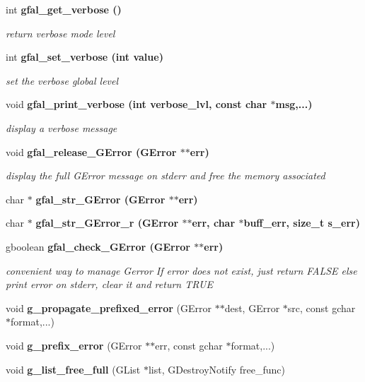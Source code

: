 \begin{CompactItemize}
\item 
int \bf{gfal\_\-get\_\-verbose} ()\label{gfal__common__errverbose_8c_135b3fdd775aa7215e2ab4de1eea495f}

\begin{CompactList}\small\item\em return verbose mode level \item\end{CompactList}\item 
int \bf{gfal\_\-set\_\-verbose} (int value)
\begin{CompactList}\small\item\em set the verbose global level \item\end{CompactList}\item 
void \bf{gfal\_\-print\_\-verbose} (int verbose\_\-lvl, const char $\ast$msg,...)
\begin{CompactList}\small\item\em display a verbose message \item\end{CompactList}\item 
void \bf{gfal\_\-release\_\-GError} (GError $\ast$$\ast$err)\label{gfal__common__errverbose_8c_1441ea4b8176eb0cf3099009b950a3e9}

\begin{CompactList}\small\item\em display the full GError message on stderr and free the memory associated \item\end{CompactList}\item 
char $\ast$ \bf{gfal\_\-str\_\-GError} (GError $\ast$$\ast$err)
\item 
char $\ast$ \bf{gfal\_\-str\_\-GError\_\-r} (GError $\ast$$\ast$err, char $\ast$buff\_\-err, size\_\-t s\_\-err)
\item 
gboolean \bf{gfal\_\-check\_\-GError} (GError $\ast$$\ast$err)\label{gfal__common__errverbose_8c_9167aee5bda42b71a982f863e88f7bfd}

\begin{CompactList}\small\item\em convenient way to manage Gerror If error does not exist, just return FALSE else print error on stderr, clear it and return TRUE \item\end{CompactList}\item 
void \textbf{g\_\-propagate\_\-prefixed\_\-error} (GError $\ast$$\ast$dest, GError $\ast$src, const gchar $\ast$format,...)\label{gfal__common__errverbose_8c_ba441719ee1fd49a708add03c0eea22f}

\item 
void \textbf{g\_\-prefix\_\-error} (GError $\ast$$\ast$err, const gchar $\ast$format,...)\label{gfal__common__errverbose_8c_0c7cc2a68d8e7b0bed51a834aa54fa0d}

\item 
void \textbf{g\_\-list\_\-free\_\-full} (GList $\ast$list, GDestroy\-Notify free\_\-func)\label{gfal__common__errverbose_8c_0d507092f75c2411862d210dbecbc4e5}

\end{CompactItemize}
